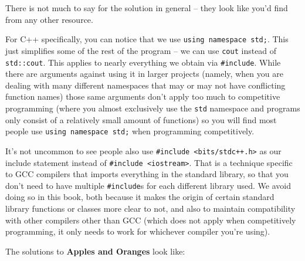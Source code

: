 There is not much to say for the solution in general -- they look like you'd find from any other resource.

For C++ specifically, you can notice that we use \texttt{using namespace std;}. This just simplifies some of the rest of the program -- we can use \texttt{cout} instead of \texttt{std::cout}. This applies to nearly everything we obtain via \texttt{#include}. While there are arguments against using it in larger projects (namely, when you are dealing with many different namespaces that may or may not have conflicting function names) those same arguments don't apply too much to competitive programming (where you almost exclusively use the \texttt{std} namespace and programs only consist of a relatively small amount of functions) so you will find most people use \texttt{using namespace std;} when programming competitively.

It's not uncommon to see people also use \texttt{#include <bits/stdc++.h>} as our include statement instead of \texttt{#include <iostream>}. That is a technique specific to GCC compilers that imports everything in the standard library, so that you don't need to have multiple \texttt{#include}s for each different library used. We avoid doing so in this book, both because it makes the origin of certain standard library functions or classes more clear to not, and also to maintain compatibility with other compilers other than GCC (which does not apply when competitively programming, it only needs to work for whichever compiler you're using).

The solutions to \textbf{Apples and Oranges} look like:


